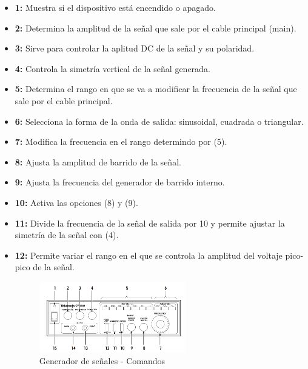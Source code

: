 \documentclass{scrartcl}
\begin{document}
\begin{itemize}
	\item \textbf{1:} Muestra si el dispositivo está encendido o apagado.
	\item \textbf{2:} Determina la amplitud de la señal que sale por el cable principal (main).
	\item \textbf{3:} Sirve para controlar la aplitud DC de la señal y su polaridad.
	\item \textbf{4:} Controla la simetría vertical de la señal generada.
	\item \textbf{5:} Determina el rango en que se va a modificar la frecuencia de la señal que sale por el cable principal.
	\item \textbf{6:} Selecciona la forma de la onda de salida: sinusoidal, cuadrada o triangular.
	\item \textbf{7:} Modifica la frecuencia en el rango determindo por (5).
	\item \textbf{8:} Ajusta la amplitud de barrido de la señal.
	\item \textbf{9:} Ajusta la frecuencia del generador de barrido interno.
	\item \textbf{10:} Activa las opciones (8) y (9).
	\item \textbf{11:} Divide la frecuencia de la señal de salida por 10 y permite ajustar la simetría de la señal con (4).
	\item \textbf{12:} Permite variar el rango en el que se controla la amplitud del voltaje pico-pico de la señal.

\begin{figure}[h!]
	\centering
	\includegraphics[width=0.60\textwidth,height=0.25\textheight]{Generador-Funciones}
	\caption{Generador de señales - Comandos}
\end{figure}




\end{itemize}
	
	
\end{document}
